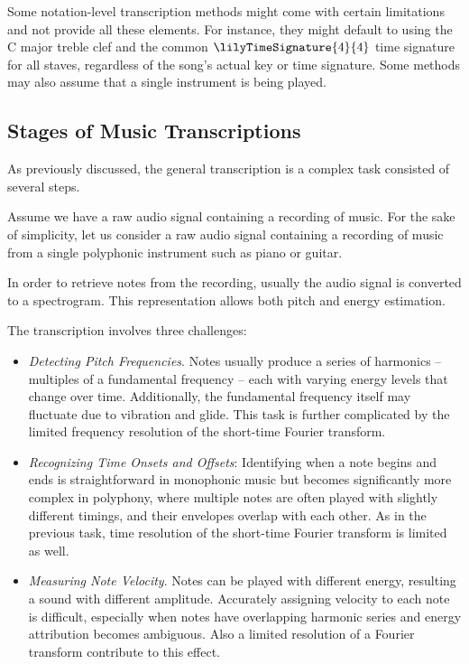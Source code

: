 Some notation-level transcription methods might come with certain limitations and not provide all these elements. For instance, they might default to using the $\textrm{C}$ major treble clef and the common $\lilyTimeSignature{4}{4}$ time signature for all staves, regardless of the song's actual key or time signature. Some methods may also assume that a single instrument is being played.

\subsection{Stages of Music Transcriptions}

As previously discussed, the general transcription is a complex task consisted of several steps.

Assume we have a raw audio signal containing a recording of music. For the sake of simplicity, let us consider a raw audio signal containing a recording of music from a single polyphonic instrument such as piano or guitar.

In order to retrieve notes from the recording, usually the audio signal is converted to a spectrogram. This representation allows both pitch and energy estimation.

The transcription involves three challenges:
\begin{itemize}
	\item \emph{Detecting Pitch Frequencies}. Notes usually produce a series of harmonics – multiples of a fundamental frequency – each with varying energy levels that change over time. Additionally, the fundamental frequency itself may fluctuate due to vibration and glide. This task is further complicated by the limited frequency resolution of the short-time Fourier transform.
	\item \emph{Recognizing Time Onsets and Offsets}: Identifying when a note begins and ends is straightforward in monophonic music but becomes significantly more complex in polyphony, where multiple notes are often played with slightly different timings, and their envelopes overlap with each other. As in the previous task, time resolution of the short-time Fourier transform is limited as well.
	\item \emph{Measuring Note Velocity}. Notes can be played with different energy, resulting a sound with different amplitude. Accurately assigning velocity to each note is difficult, especially when notes have overlapping harmonic series and energy attribution becomes ambiguous. Also a limited resolution of a Fourier transform contribute to this effect.
\end{itemize}

